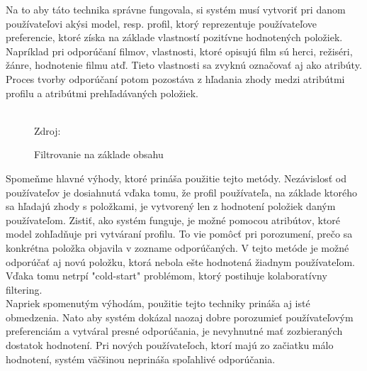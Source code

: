 Na to aby táto technika správne fungovala, si systém musí vytvoriť pri danom používateľovi akýsi model, resp. profil, ktorý reprezentuje používateľove preferencie, ktoré získa na základe vlastností pozitívne hodnotených položiek. Napríklad pri odporúčaní filmov, vlastnosti, ktoré opisujú film sú herci, režiséri, žánre, hodnotenie filmu atď. Tieto vlastnosti sa zvyknú označovať aj ako atribúty. Proces tvorby odporúčaní potom pozostáva z hľadania zhody medzi atribútmi profilu a atribútmi prehľadávaných položiek. \cite{rs1} \\\\
\begin{figure}[!htbp]
  \centering  
  \def\stackalignment{c}
           {\scriptsize%
            Zdroj: \cite{rs3}}
  \caption{Filtrovanie na základe obsahu}
  
  \label{contentFiltering}
\end{figure}

Spomeňme hlavné výhody, ktoré prináša použitie tejto metódy. Nezávislosť od používateľov je dosiahnutá vďaka tomu, že profil používateľa, na základe ktorého sa hľadajú zhody s položkami, je vytvorený len z hodnotení položiek daným používateľom. Zistiť, ako systém funguje, je možné pomocou atribútov, ktoré model zohľadňuje pri vytváraní profilu. To vie pomôcť pri porozumení, prečo sa konkrétna položka objavila v zozname odporúčaných. V tejto metóde je možné odporúčať aj novú položku, ktorá nebola ešte hodnotená žiadnym používateľom. Vďaka tomu netrpí "cold-start" problémom, ktorý postihuje kolaboratívny filtering. \cite{rs1} \\

Napriek spomenutým výhodám, použitie tejto techniky prináša aj isté obmedzenia. Nato aby systém dokázal naozaj dobre porozumieť používateľovým preferenciám a vytváral presné odporúčania, je nevyhnutné mať zozbieraných dostatok hodnotení. Pri nových používateľoch, ktorí majú zo začiatku málo hodnotení, systém väčšinou neprináša spoľahlivé odporúčania. 

